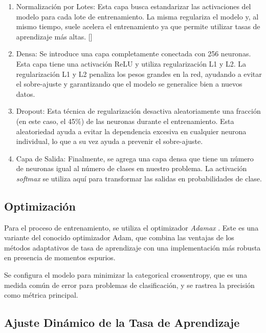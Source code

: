 \begin{enumerate}
   \item Normalización por Lotes: Esta capa busca estandarizar las activaciones del modelo para cada lote de entrenamiento. 
   La misma regulariza el modelo y, al mismo tiempo, suele acelera el entrenamiento ya que permite utilizar tasas de aprendizaje más altas. [\cite{regularization}]

   \item Densa: Se introduce una capa completamente conectada con 256 neuronas. Esta capa tiene una activación ReLU y utiliza regularización L1 y L2.
   La regularización L1 y L2 penaliza los pesos grandes en la red, ayudando a evitar el sobre-ajuste y garantizando que el modelo se generalice
    bien a nuevos datos. \cite{dense}
   
   \item Dropout: Esta técnica de regularización desactiva aleatoriamente una fracción (en este caso, el 45\%) de las neuronas durante el 
   entrenamiento. Esta aleatoriedad ayuda a evitar la dependencia excesiva en cualquier neurona individual, lo que a su vez ayuda a prevenir
    el sobre-ajuste. \cite{dropout}
   
   \item Capa de Salida: Finalmente, se agrega una capa densa que tiene un número de neuronas igual al número de clases en nuestro problema. 
   La activación \textit{softmax} se utiliza aquí para transformar las salidas en probabilidades de clase.

\end{enumerate}

\subsection{Optimización}

Para el proceso de entrenamiento, se utiliza el optimizador \textit{Adamax} \cite{adamax}. Este es una variante del conocido optimizador Adam, 
que combina las ventajas de los métodos adaptativos de tasa de aprendizaje con una implementación más robusta en presencia de momentos espurios. 

Se configura el modelo para minimizar la categorical crossentropy, que es una medida común de error para problemas de clasificación, y se 
rastrea la precisión como métrica principal.

\subsection{Ajuste Dinámico de la Tasa de Aprendizaje}

